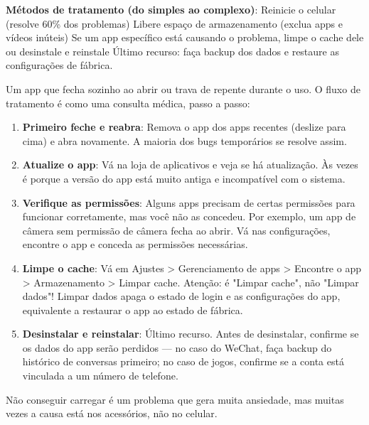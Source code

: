 \textbf{Métodos de tratamento (do simples ao complexo)}: Reinicie o celular (resolve 60\% dos problemas) Libere espaço de armazenamento (exclua apps e vídeos inúteis) Se um app específico está causando o problema, limpe o cache dele ou desinstale e reinstale Último recurso: faça backup dos dados e restaure as configurações de fábrica.


Um app que fecha sozinho ao abrir ou trava de repente durante o uso. O fluxo de tratamento é como uma consulta médica, passo a passo:

\begin{enumerate}
  \item \textbf{Primeiro feche e reabra}: Remova o app dos apps recentes (deslize para cima) e abra novamente. A maioria dos bugs temporários se resolve assim.
  \item \textbf{Atualize o app}: Vá na loja de aplicativos e veja se há atualização. Às vezes é porque a versão do app está muito antiga e incompatível com o sistema.
  \item \textbf{Verifique as permissões}: Alguns apps precisam de certas permissões para funcionar corretamente, mas você não as concedeu. Por exemplo, um app de câmera sem permissão de câmera fecha ao abrir. Vá nas configurações, encontre o app e conceda as permissões necessárias.
  \item \textbf{Limpe o cache}: Vá em Ajustes > Gerenciamento de apps > Encontre o app > Armazenamento > Limpar cache. Atenção: é "Limpar cache", não "Limpar dados"! Limpar dados apaga o estado de login e as configurações do app, equivalente a restaurar o app ao estado de fábrica.
  \item \textbf{Desinstalar e reinstalar}: Último recurso. Antes de desinstalar, confirme se os dados do app serão perdidos — no caso do WeChat, faça backup do histórico de conversas primeiro; no caso de jogos, confirme se a conta está vinculada a um número de telefone.
\end{enumerate}


Não conseguir carregar é um problema que gera muita ansiedade, mas muitas vezes a causa está nos acessórios, não no celular.

